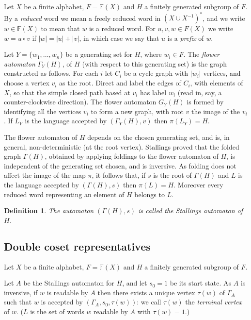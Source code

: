 \documentclass[a4paper,12pt]{article}
\newcommand{\G}{\Gamma }
\renewcommand{\t}{\tau }
\newtheorem{definition}[theorem]{Definition}
\numberwithin{equation}{section}
\numberwithin{figure}{section}
\newcommand{\FF}{\ensuremath{\mathbb{F}}}
\begin{document}
Let $X$ be a finite alphabet, $F=\FF(X)$ and $H$ a finitely generated subgroup
of $F$.  By a {\em reduced} word we mean
 a freely reduced word in $(X\cup X^{-1})^\ast$, and we write $w\in \FF(X)$
to mean that $w$ is a reduced word. For $u,v, w\in F(X)$ we
write $w=u\circ v$ if $|w|=|u|+|v|$, in which case we say that $u$ is a {\em prefix}
of $w$. 

Let $Y=\{w_1,\ldots ,w_n\}$ be a generating set for $H$, where $w_i\in F$. 
The {\em flower automaton} $\G_Y(H)$, of $H$ (with respect to this generating set)
is the graph constructed as follows. For each $i$ let $C_i$ be a cycle
graph with $|w_i|$ vertices, and choose a vertex $v_i$ as the root. Direct
and label the edges of $C_i$, with elements of $X$,  
so that the simple closed path based at $v_i$ has
label $w_i$ (read in, say, a counter-clockwise direction). The flower
automaton $G_Y(H)$ is formed by identifying all the vertices $v_i$ to form 
a new graph, with root $v$ the image of the $v_i$. If $L_Y$ is the language  accepted
by $(\G_Y(H), v)$ then $\pi(L_Y)=H$. 
 

The flower automaton of $H$ depends on the chosen generating set, and is, 
in general,
non-deterministic (at the root vertex). Stallings \cite{stallings83} 
proved that the folded graph $\G(H)$, obtained by applying foldings to the 
flower automaton of $H$, is  independent of the generating set chosen, and
is inversive.
As folding does not affect the image of the map $\pi$, it follows that, if
$s$ is the root of $\G(H)$ and $L$ is the language accepted by $(\G(H),s)$ 
then 
$\pi(L) =H$. 
Moreover  
every reduced word representing an element of $H$ belongs to $L$.
\begin{definition}
The automaton $(\G(H),s)$ is  called the {\em Stallings automaton} of $H$. 
\end{definition}
\subsection{Double coset representatives}\label{sub:2cosetrepr}
Let $X$ be a finite alphabet, $F=\FF(X)$ and $H$ a finitely generated subgroup
of $F$. 

Let $A$ be the Stallings automaton for $H$, and let  $s_0 =
1$ be its start state. 
As $A$ is inversive, if $w$ is readable by $A$ then there exists a
unique vertex  $\t(w)$ of $\G_A$ such that $w$ is accepted by 
$(\G_A,s_0,\t(w))$: we call $\t(w)$ the {\em terminal vertex} of $w$. ($L$ is the set of words $w$ readable by $A$ with 
$\t(w)=1$.) 
\end{document}
